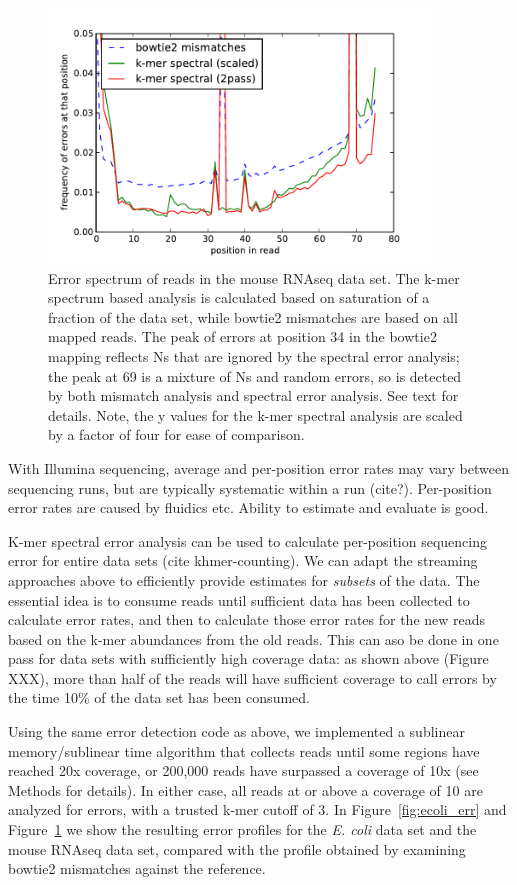 \documentclass{article}
\begin{document}
\begin{figure}[!ht]
 \centerline{\includegraphics[width=4in]{./figures/rseq-errhist}}
\caption{Error spectrum of reads in the mouse RNAseq data set. The
  k-mer spectrum based analysis is calculated based on saturation of a
  fraction of the data set, while bowtie2 mismatches are based on all
  mapped reads. The peak of errors at position 34 in the bowtie2
  mapping reflects Ns that are ignored by the spectral error analysis;
  the peak at 69 is a mixture of Ns and random errors, so is detected
  by both mismatch analysis and spectral error analysis.  See text for
  details.  Note, the y values for the k-mer spectral analysis are
  scaled by a factor of four for ease of comparison.  }
\label{fig:rseq_err}
\end{figure}

With Illumina sequencing, average and per-position error rates may
vary between sequencing runs, but are typically systematic within a
run (cite?).  Per-position error rates are caused by fluidics etc.
Ability to estimate and evaluate is good.

K-mer spectral error analysis can be used to calculate per-position
sequencing error for entire data sets (cite khmer-counting).  We can
adapt the streaming approaches above to efficiently provide estimates
for {\em subsets} of the data.  The essential idea is to consume reads
until sufficient data has been collected to calculate error rates, and
then to calculate those error rates for the new reads based on the
k-mer abundances from the old reads.  This can aso be done in one pass
for data sets with sufficiently high coverage data: as shown above
(Figure XXX), more than half of the reads will have sufficient
coverage to call errors by the time 10\% of the data set has been
consumed.

Using the same error detection code as above, we implemented a
sublinear memory/sublinear time algorithm that collects reads until
some regions have reached 20x coverage, or 200,000 reads have
surpassed a coverage of 10x (see Methods for details).  In either
case, all reads at or above a coverage of 10 are analyzed for errors,
with a trusted k-mer cutoff of 3.  In Figure~\ref{fig:ecoli_err} and
Figure~\ref{fig:rseq_err} we show the resulting error profiles for the
{\em E. coli} data set and the mouse RNAseq data set, compared with
the profile obtained by examining bowtie2 mismatches against the
reference.
\end{document}
